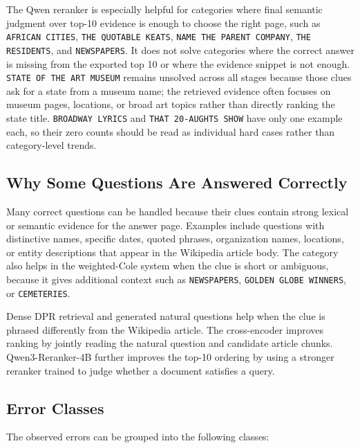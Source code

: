 \documentclass[11pt]{article}
\begin{document}
The Qwen reranker is especially helpful for categories where final semantic judgment over top-10 evidence is enough to choose the right page, such as \texttt{AFRICAN CITIES}, \texttt{THE QUOTABLE KEATS}, \texttt{NAME THE PARENT COMPANY}, \texttt{THE RESIDENTS}, and \texttt{NEWSPAPERS}. It does not solve categories where the correct answer is missing from the exported top 10 or where the evidence snippet is not enough. \texttt{STATE OF THE ART MUSEUM} remains unsolved across all stages because those clues ask for a state from a museum name; the retrieved evidence often focuses on museum pages, locations, or broad art topics rather than directly ranking the state title. \texttt{BROADWAY LYRICS} and \texttt{THAT 20-AUGHTS SHOW} have only one example each, so their zero counts should be read as individual hard cases rather than category-level trends.

\subsection{Why Some Questions Are Answered Correctly}

Many correct questions can be handled because their clues contain strong lexical or semantic evidence for the answer page. Examples include questions with distinctive names, specific dates, quoted phrases, organization names, locations, or entity descriptions that appear in the Wikipedia article body. The category also helps in the weighted-Cole system when the clue is short or ambiguous, because it gives additional context such as \texttt{NEWSPAPERS}, \texttt{GOLDEN GLOBE WINNERS}, or \texttt{CEMETERIES}.

Dense DPR retrieval and generated natural questions help when the clue is phrased differently from the Wikipedia article. The cross-encoder improves ranking by jointly reading the natural question and candidate article chunks. Qwen3-Reranker-4B further improves the top-10 ordering by using a stronger reranker trained to judge whether a document satisfies a query.

\subsection{Error Classes}

The observed errors can be grouped into the following classes:
\end{document}
